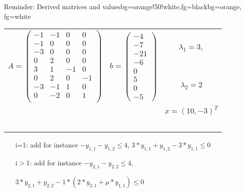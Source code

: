\begin{frame}
	\begin{variableblock}{Reminder: Derived matrices and values}{bg=orange!50!white,fg=black}{bg=orange, fg=white}
		\begin{tabular}{llc}
			\multirow{2}{*}{$A=\begin{pmatrix}
				-1 		& -1 		&  0		& 0		 \\
				-1 		& 0 		&  0		& 0		 \\
				-3 		& 0 		&  0		& 0		 \\
				0 		& 2 		&  0		& 0		 \\
				3 		& 1 		&  -1		& 0		 \\
				0 		& 2 		&  0		& -1	 \\
				-3 		& -1 		&  1		& 0		 \\
				0 		& -2 		&  0		& 1	 	 \\
				\end{pmatrix}$}&\multirow{2}{*}{$ b=\begin{pmatrix}
				-4 \\ -7 \\ -21 \\ -6 \\ 0 \\ 5 \\ 0 \\ -5
				\end{pmatrix} $}& $\lambda_1 = 3,$ \\
			& &  $\lambda_2 = 2$\\
			& & $x=(10, -3)^T$ \\
			& & \\
			& & \\
			& & \\
			& & \\
			& & \\
		\end{tabular}
	\end{variableblock}
	\begin{example}
		\begin{itemize}
			\setlength{\itemindent}{0.25cm}
			\item[i=1:] add for instance $-y_{1,1}-y_{1,2}\le 4$, $3*y_{1,1}+y_{1,2}-3*y_{1,1}\le0$
			\item[i$>$1:] add for instance $-y_{2,1}-y_{2,2}\le 4$, 
			\item[] $3*y_{2,1}+y_{2,2}-1*(2*y_{2,1}+\mu*y_{1,1})\le0$
		\end{itemize}
	\end{example}
\end{frame}

